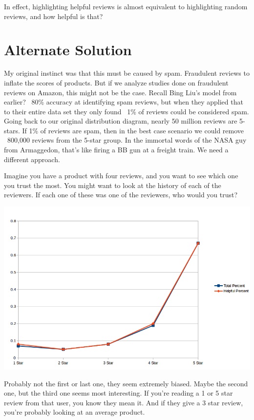 \documentclass[a4paper,10pt]{article}
\begin{document}
In effect, highlighting helpful reviews is almost equivalent to highlighting random reviews, and how helpful is that?

\section*{Alternate Solution}
My original instinct was that this must be caused by spam. Fraudulent reviews to inflate the scores of products. But if we analyze studies done on fraudulent reviews on Amazon, this might not be the case. Recall Bing Liu's model from earlier? ~80\% accuracy at identifying spam reviews, but when they applied that to their entire data set they only found ~1\% of reviews could be considered spam. Going back to our original distribution diagram, nearly 50 million reviews are 5-stars. If 1\% of reviews are spam, then in the best case scenario we could remove ~800,000 reviews from the 5-star group. In the immortal words of the NASA guy from Armaggedon, that's like firing a BB gun at a freight train. We need a different approach.

Imagine you have a product with four reviews, and you want to see which one you trust the most. You might want to look at the history of each of the reviewers. If each one of these was one of the reviewers, who would you trust?

\begin{center}
    \includegraphics[scale=0.2]{helpfulness.png}
\end{center}

Probably not the first or last one, they seem extremely biased. Maybe the second one, but the third one seems most interesting. If you're reading a 1 or 5 star review from that user, you know they mean it. And if they give a 3 star review, you're probably looking at an average product.
\end{document}
